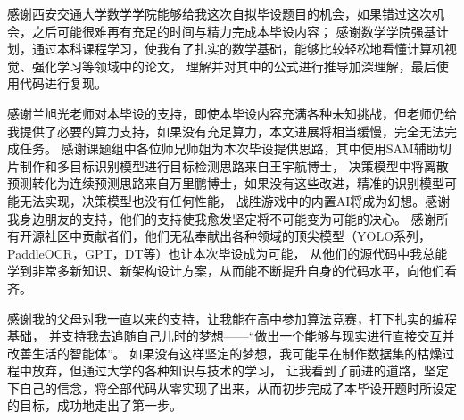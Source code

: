 

感谢西安交通大学数学学院能够给我这次自拟毕设题目的机会，如果错过这次机会，之后可能很难再有充足的时间与精力完成本毕设内容；
感谢数学学院强基计划，通过本科课程学习，使我有了扎实的数学基础，能够比较轻松地看懂计算机视觉、强化学习等领域中的论文，
理解并对其中的公式进行推导加深理解，最后使用代码进行复现。

感谢兰旭光老师对本毕设的支持，即使本毕设内容充满各种未知挑战，但老师仍给我提供了必要的算力支持，如果没有充足算力，本文进展将相当缓慢，完全无法完成任务。
感谢课题组中各位师兄师姐为本次毕设提供思路，其中使用SAM辅助切片制作和多目标识别模型进行目标检测思路来自王宇航博士，
决策模型中将离散预测转化为连续预测思路来自万里鹏博士，如果没有这些改进，精准的识别模型可能无法实现，决策模型也没有任何性能，
战胜游戏中的内置AI将成为幻想。感谢我身边朋友的支持，他们的支持使我愈发坚定将不可能变为可能的决心。
感谢所有开源社区中贡献者们，他们无私奉献出各种领域的顶尖模型（YOLO系列，PaddleOCR，GPT，DT等）也让本次毕设成为可能，
从他们的源代码中我总能学到非常多新知识、新架构设计方案，从而能不断提升自身的代码水平，向他们看齐。

感谢我的父母对我一直以来的支持，让我能在高中参加算法竞赛，打下扎实的编程基础，
并支持我去追随自己儿时的梦想——“做出一个能够与现实进行直接交互并改善生活的智能体”。
如果没有这样坚定的梦想，我可能早在制作数据集的枯燥过程中放弃，但通过大学的各种知识与技术的学习，
让我看到了前进的道路，坚定下自己的信念，将全部代码从零实现了出来，从而初步完成了本毕设开题时所设定的目标，成功地走出了第一步。
